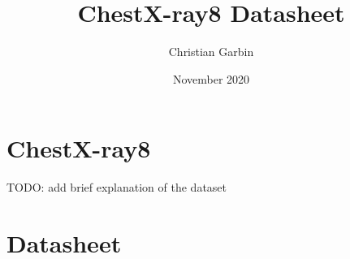 \documentclass{article}
\title{ChestX-ray8 Datasheet}
\author{Christian Garbin}
\date{November 2020}
\begin{document}
\maketitle

\newcommand{\dssectionheader}[1]{%
   \noindent\framebox[\columnwidth]{%
      {\fontfamily{phv}\selectfont \textbf{\textcolor{blue}{#1}}}
   }
}

\newcommand{\dsquestion}[1]{%
   {\noindent \scriptsize {\fontfamily{phv}\selectfont \textcolor{blue}{\textbf{#1}}}}
}

\newcommand{\dsquestionex}[2]{%
   {\noindent \scriptsize {\fontfamily{phv}\selectfont \textcolor{blue}{\textbf{#1} #2}}}
}

\newcommand{\dsanswer}[1]{%
   {\noindent \footnotesize {#1} \medskip}
}

\section{ChestX-ray8}

TODO: add brief explanation of the dataset

\section{Datasheet}
\end{document}
